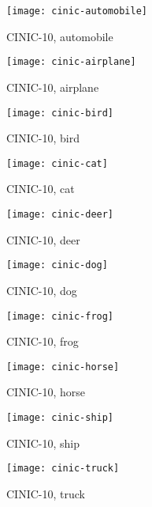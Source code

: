 \documentclass[coverpage]{Style/inftechrep}
\begin{document}
\begin{figure}[!htbp]
\centering
    \texttt{[image: cinic-automobile]}
    \caption{CINIC-10, automobile}
  \label{fig:automobile}
\end{figure}

\begin{figure}[!htbp]
\centering
    \texttt{[image: cinic-airplane]}
    \caption{CINIC-10, airplane}
  \label{fig:airplane}
\end{figure}

\begin{figure}[!htbp]
\centering
    \texttt{[image: cinic-bird]}
    \caption{CINIC-10, bird}
  \label{fig:bird}
\end{figure}

\begin{figure}[!htbp]
\centering
    \texttt{[image: cinic-cat]}
    \caption{CINIC-10, cat}
  \label{fig:cat}
\end{figure}

\begin{figure}[!htbp]
\centering
    \texttt{[image: cinic-deer]}
    \caption{CINIC-10, deer}
  \label{fig:deer}
\end{figure}

\begin{figure}[!htbp]
\centering
    \texttt{[image: cinic-dog]}
    \caption{CINIC-10, dog}
  \label{fig:dog}
\end{figure}

\begin{figure}[!htbp]
\centering
    \texttt{[image: cinic-frog]}
    \caption{CINIC-10, frog}
  \label{fig:frog}
\end{figure}

\begin{figure}[!htbp]
\centering
    \texttt{[image: cinic-horse]}
    \caption{CINIC-10, horse}
  \label{fig:horse}
\end{figure}

\begin{figure}[!htbp]
\centering
    \texttt{[image: cinic-ship]}
    \caption{CINIC-10, ship}
  \label{fig:ship}
\end{figure}

\begin{figure}[!htbp]
\centering
    \texttt{[image: cinic-truck]}
    \caption{CINIC-10, truck}
  \label{fig:truck}
\end{figure}
\end{document}
